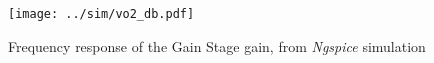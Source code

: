 \vspace{-2cm}
\begin{figure}[H]
\centering
  \texttt{[image: ../sim/vo2\_db.pdf]}
  \caption{Frequency response of the Gain Stage gain, from \textit{Ngspice} simulation}
  \label{fig:gain_stage_gain(freq)}
\end{figure}









